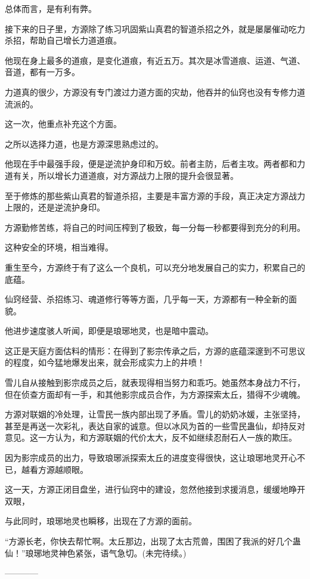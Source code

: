 \begin{this_body}
总体而言，是有利有弊。

接下来的日子里，方源除了练习巩固紫山真君的智道杀招之外，就是屡屡催动吃力杀招，帮助自己增长力道道痕。

他现在身上最多的道痕，是变化道痕，有近五万。其次是冰雪道痕、运道、气道、音道，都有一万多。

力道真的很少，方源没有专门渡过力道方面的灾劫，他吞并的仙窍也没有专修力道流派的。

这一次，他重点补充这个方面。

之所以选择力道，也是方源深思熟虑过的。

他现在手中最强手段，便是逆流护身印和万蛟。前者主防，后者主攻。两者都和力道有关，所以增长力道道痕，对方源战力上限的提升会很显著。

至于修炼的那些紫山真君的智道杀招，主要是丰富方源的手段，真正决定方源战力上限的，还是逆流护身印。

方源勤修苦练，将自己的时间压榨到了极致，每一分每一秒都要得到充分的利用。

这种安全的环境，相当难得。

重生至今，方源终于有了这么一个良机，可以充分地发展自己的实力，积累自己的底蕴。

仙窍经营、杀招练习、魂道修行等等方面，几乎每一天，方源都有一种全新的面貌。

他进步速度骇人听闻，即便是琅琊地灵，也是暗中震动。

这正是天庭方面估料的情形：在得到了影宗传承之后，方源的底蕴深邃到不可思议的程度，如今猛地爆发出来，就会形成实力上的井喷！

雪儿自从接触到影宗成员之后，就表现得相当努力和乖巧。她虽然本身战力不行，但在侦查方面却有一手，和其他影宗成员合作，为方源探索太丘，猎得不少魂魄。

方源对联姻的冷处理，让雪民一族内部出现了矛盾。雪儿的奶奶冰媛，主张坚持，甚至是再送一次彩礼，表达自家的诚意。但以冰风为首的一些雪民蛊仙，却持反对意见。这一方认为，和方源联姻的代价太大，反不如继续忍耐石人一族的欺压。

因为影宗成员的出力，导致琅琊派探索太丘的进度变得很快，这让琅琊地灵开心不已，越看方源越顺眼。

这一天，方源正闭目盘坐，进行仙窍中的建设，忽然他接到求援消息，缓缓地睁开双眼，

与此同时，琅琊地灵也瞬移，出现在了方源的面前。

“方源长老，你快去帮忙啊。太丘那边，出现了太古荒兽，围困了我派的好几个蛊仙！”琅琊地灵神色紧张，语气急切。(未完待续。)

------------

\end{this_body}

